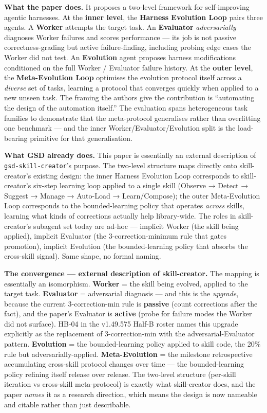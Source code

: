 \documentclass[11pt,letterpaper]{article}
\begin{document}
\textbf{What the paper does.} It proposes a two-level framework for
self-improving agentic harnesses. At the \textbf{inner level}, the
\textbf{Harness Evolution Loop} pairs three agents. A \textbf{Worker}
attempts the target task. An \textbf{Evaluator} \emph{adversarially}
diagnoses Worker failures and scores performance --- its job is not
passive correctness-grading but active failure-finding, including
probing edge cases the Worker did not test. An \textbf{Evolution} agent
proposes harness modifications conditioned on the full Worker /
Evaluator failure history. At the \textbf{outer level}, the
\textbf{Meta-Evolution Loop} optimises the evolution protocol itself
across a \emph{diverse} set of tasks, learning a protocol that converges
quickly when applied to a new unseen task. The framing the authors give
the contribution is ``automating the design of the automation itself.''
The evaluation spans heterogeneous task families to demonstrate that the
meta-protocol generalises rather than overfitting one benchmark --- and
the inner Worker/Evaluator/Evolution split is the load-bearing primitive
for that generalisation.

\textbf{What GSD already does.} This paper is essentially an external
description of \texttt{gsd-skill-creator}'s purpose. The two-level
structure maps directly onto skill-creator's existing design: the inner
Harness Evolution Loop corresponds to skill-creator's six-step learning
loop applied to a single skill (Observe → Detect → Suggest → Manage →
Auto-Load → Learn/Compose); the outer Meta-Evolution Loop corresponds to
the bounded-learning policy that operates \emph{across} skills, learning
what kinds of corrections actually help library-wide. The roles in
skill-creator's subagent set today are ad-hoc --- implicit Worker (the
skill being applied), implicit Evaluator (the 3-correction-minimum rule
that gates promotion), implicit Evolution (the bounded-learning policy
that absorbs the cross-skill signal). Same shape, no formal naming.

\textbf{The convergence --- external description of skill-creator.} The
mapping is essentially an isomorphism. \textbf{Worker} = the skill being
evolved, applied to the target task. \textbf{Evaluator} = adversarial
diagnosis --- and this is the \emph{upgrade}, because the current
3-correction-min rule is \textbf{passive} (count corrections after the
fact), and the paper's Evaluator is \textbf{active} (probe for failure
modes the Worker did not surface). HB-04 in the v1.49.575 Half-B roster
names this upgrade explicitly as the replacement of 3-correction-min
with the adversarial-Evaluator pattern. \textbf{Evolution} = the
bounded-learning policy applied to skill code, the 20\% rule but
adversarially-applied. \textbf{Meta-Evolution} = the milestone
retrospective accumulating cross-skill protocol changes over time ---
the bounded-learning policy refining itself release over release. The
two-level structure (per-skill iteration vs cross-skill meta-protocol)
is exactly what skill-creator does, and the paper \emph{names} it as a
research direction, which means the design is now nameable and citable
rather than just describable.
\end{document}
